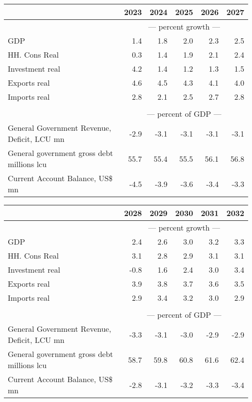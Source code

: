 \documentclass{article}
\begin{document}
\begin{table}[ht]
\begin{tabular}{lrrrrr}
\toprule
 & 2023 & 2024 & 2025 & 2026 & 2027 \\
\midrule
&\multicolumn{5}{c}{--- percent growth ---}                                                                                                     \\
GDP & 1.4 & 1.8 & 2.0 & 2.3 & 2.5 \\
HH. Cons Real & 0.3 & 1.4 & 1.9 & 2.1 & 2.4 \\
Investment real & 4.2 & 1.4 & 1.2 & 1.3 & 1.5 \\
Exports real & 4.6 & 4.5 & 4.3 & 4.1 & 4.0 \\
Imports real & 2.8 & 2.1 & 2.5 & 2.7 & 2.8 \\
&\multicolumn{5}{c}{  }                                                                                                     \\
&\multicolumn{5}{c}{--- percent of GDP ---}                                                                                                     \\
General Government Revenue, Deficit, LCU mn & -2.9 & -3.1 & -3.1 & -3.1 & -3.1 \\
General government gross debt millions lcu & 55.7 & 55.4 & 55.5 & 56.1 & 56.8 \\
Current Account Balance, US\$ mn & -4.5 & -3.9 & -3.6 & -3.4 & -3.3 \\
\bottomrule
\end{tabular}
\end{table}
 \begin{table}[ht]
\begin{tabular}{lrrrrr}
\toprule
 & 2028 & 2029 & 2030 & 2031 & 2032 \\
\midrule
&\multicolumn{5}{c}{--- percent growth ---}                                                                                                     \\
GDP & 2.4 & 2.6 & 3.0 & 3.2 & 3.3 \\
HH. Cons Real & 3.1 & 2.8 & 2.9 & 3.1 & 3.1 \\
Investment real & -0.8 & 1.6 & 2.4 & 3.0 & 3.4 \\
Exports real & 3.9 & 3.8 & 3.7 & 3.6 & 3.5 \\
Imports real & 2.9 & 3.4 & 3.2 & 3.0 & 2.9 \\
&\multicolumn{5}{c}{  }                                                                                                     \\
&\multicolumn{5}{c}{--- percent of GDP ---}                                                                                                     \\
General Government Revenue, Deficit, LCU mn & -3.3 & -3.1 & -3.0 & -2.9 & -2.9 \\
General government gross debt millions lcu & 58.7 & 59.8 & 60.8 & 61.6 & 62.4 \\
Current Account Balance, US\$ mn & -2.8 & -3.1 & -3.2 & -3.3 & -3.4 \\
\bottomrule
\end{tabular}
\end{table}
\end{document}
